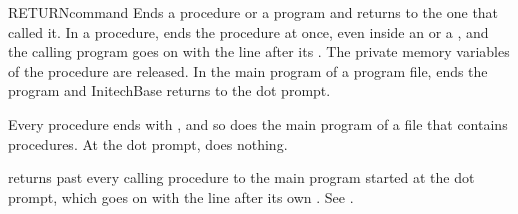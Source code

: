 \begin{XbaseEntry}{RETURN}{command}
Ends a procedure or a program and returns to the one that called it.
\Syntax
{}
\Usage
In a procedure,  ends the procedure at once, even inside an
 or a , and the calling program goes on with the line
after its .  The private memory variables of the procedure are
released.  In the main program of a program file,  ends the program
and InitechBase returns to the dot prompt.

Every procedure ends with , and so does the main program of a file
that contains procedures.  At the dot prompt,  does nothing.

 returns past every calling procedure to the main program
started at the dot prompt, which goes on with the line after its own
.
\Examples
See .
\end{XbaseEntry}

